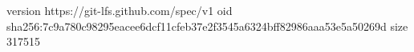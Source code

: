 version https://git-lfs.github.com/spec/v1
oid sha256:7c9a780c98295eacee6dcf11cfeb37e2f3545a6324bff82986aaa53e5a50269d
size 317515
